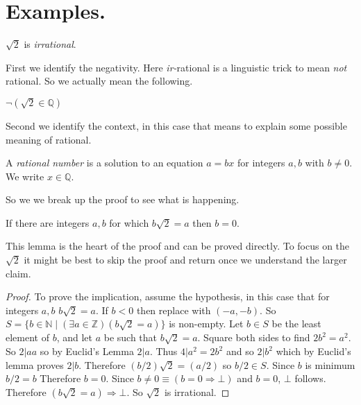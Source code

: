 




\section{Examples.}

\begin{proposition}
   $\sqrt{2}$ is \emph{irrational}. 
\end{proposition}
First we identify the negativity.  Here \emph{ir-}rational is a 
linguistic trick to mean \emph{not} rational.  So we actually mean the following.

\begin{proposition}
    $\neg(\sqrt{2}\in \mathbb{Q})$
\end{proposition}

Second we identify the context, in this case that means to explain 
some possible meaning of rational.

\begin{definition}
    A \emph{rational number} is a solution to an equation 
    $a=bx$ for integers $a,b$ with $b\neq 0$.
    We write $x\in \mathbb{Q}$.
\end{definition}

So we we break up the proof to see what is happening.
\begin{lemma}\label{lem:irrational}
    If there are integers $a,b$ for which $b\sqrt{2}=a$ then 
    $b=0$.
\end{lemma}

This lemma is the heart of the proof and can be proved directly.
To focus on the $\sqrt{2}$ it might be best to skip the proof and return 
once we understand the larger claim.

\begin{proof}
    To prove the implication, assume the hypothesis, in this case 
    that for integers $a,b$ $b\sqrt{2}=a$.
    If $b<0$ then replace with $(-a,-b)$.
    So $S=\{b\in \mathbb{N}\mid (\exists a\in \mathbb{Z})(b\sqrt{2}=a)\}$
    is non-empty.  Let $b\in S$ be the least element of $b$, and 
    let $a$ be such that $b\sqrt{2}=a$.
    Square both sides to find $2b^2=a^2$.  So $2|aa$ so by Euclid's 
    Lemma $2|a$. Thus $4|a^2=2b^2$ and so $2|b^2$ which by 
    Euclid's lemma proves $2|b$.  Therefore $(b/2)\sqrt{2}=(a/2)$ 
    so $b/2\in S$.  Since $b$ is minimum $b/2=b$  Therefore 
    $b=0$.  Since $b\neq 0\equiv (b=0\Rightarrow \bot)$ and $b=0$,
    $\bot$ follows.  Therefore $(b\sqrt{2}=a)\Rightarrow \bot$.
    So $\sqrt{2}$ is irrational.
\end{proof}

